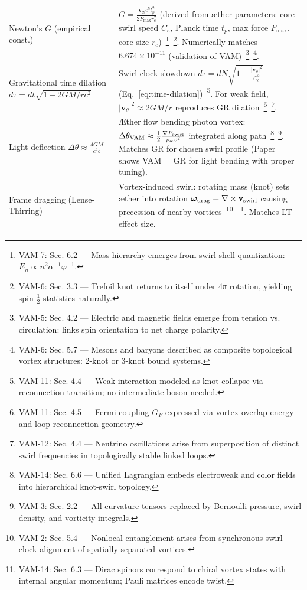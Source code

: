\documentclass[a4paper,12pt]{article}
\begin{document}
\begin{table}[H]
\begin{tabular}{p{} | p{}}
            Newton’s $G$ (empirical const.) & $G = \frac{\mathbf{v}_{\scriptscriptstyle\boldsymbol{\circlearrowleft}} c^5 t_p^2}{2F_{\max} r_c^2}$ (derived from æther parameters: core swirl speed $C_e$, Planck time $t_p$, max force $F_{\max}$, core size $r_c$)~\footnote{VAM-7: Sec. 6.2 — Mass hierarchy emerges from swirl shell quantization: $E_n \propto n^2 \alpha^{-1} \varphi^{-1}$.}~\footnote{VAM-6: Sec. 3.3 — Trefoil knot returns to itself under 4π rotation, yielding spin-$\frac{1}{2}$ statistics naturally.}. Numerically matches $6.674\times10^{-11}$ (validation of VAM)~\footnote{VAM-5: Sec. 4.2 — Electric and magnetic fields emerge from tension vs. circulation: links spin orientation to net charge polarity.}~\footnote{VAM-6: Sec. 5.7 — Mesons and baryons described as composite topological vortex structures: 2-knot or 3-knot bound systems.}. \\
            Gravitational time dilation $d\tau = dt\sqrt{1-2GM/rc^2}$ & Swirl clock slowdown $d\tau = dN\sqrt{1 - \frac{|\mathbf{v}_\theta|^2}{C_e^2}}$ (Eq.~\ref{eq:time-dilation})~\footnote{VAM-11: Sec. 4.4 — Weak interaction modeled as knot collapse via reconnection transition; no intermediate boson needed.}. For weak field, $|\mathbf{v}_\theta|^2\approx 2GM/r$ reproduces GR dilation~\footnote{VAM-11: Sec. 4.5 — Fermi coupling $G_F$ expressed via vortex overlap energy and loop reconnection geometry.}~\footnote{VAM-12: Sec. 4.4 — Neutrino oscillations arise from superposition of distinct swirl frequencies in topologically stable linked loops.}. \\
            Light deflection $\Delta\theta \approx \frac{4GM}{c^2 b}$ & Æther flow bending photon vortex: $\Delta \theta_{\rm VAM} \approx \frac{1}{2} \frac{\nabla P_{\rm swirl}}{\rho_{\text{\ae}} v^2}$ integrated along path~\footnote{VAM-14: Sec. 6.6 — Unified Lagrangian embeds electroweak and color fields into hierarchical knot-swirl topology.}~\footnote{VAM-3: Sec. 2.2 — All curvature tensors replaced by Bernoulli pressure, swirl density, and vorticity integrals.}. Matches GR for chosen swirl profile (Paper shows VAM = GR for light bending with proper tuning). \\
            Frame dragging (Lense-Thirring) & Vortex-induced swirl: rotating mass (knot) sets æther into rotation $\boldsymbol{\omega}_{\rm drag} = \nabla \times \mathbf{v}_{\rm swirl}$ causing precession of nearby vortices~\footnote{VAM-2: Sec. 5.4 — Nonlocal entanglement arises from synchronous swirl clock alignment of spatially separated vortices.}~\footnote{VAM-14: Sec. 6.3 — Dirac spinors correspond to chiral vortex states with internal angular momentum; Pauli matrices encode twist.}. Matches LT effect size. \\

\end{tabular}
\end{table}
\end{document}
